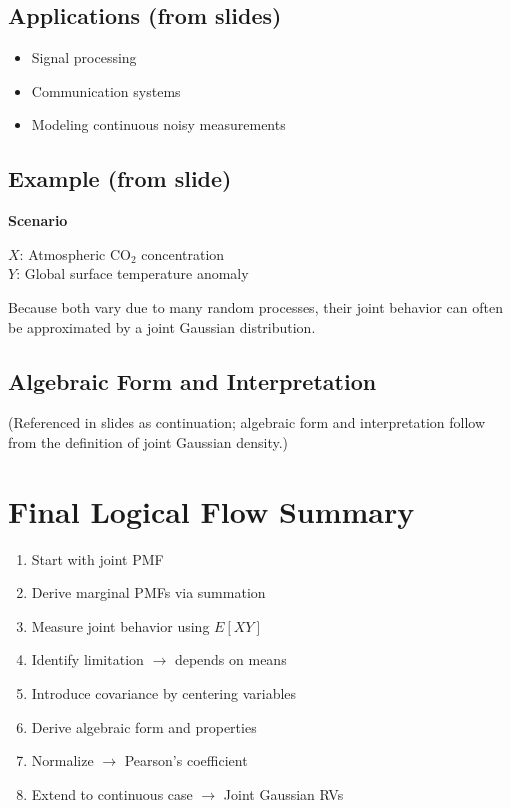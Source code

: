 \documentclass[12pt]{article}
\begin{document}
\subsection{Applications (from slides)}

\begin{itemize}
\item Signal processing
\item Communication systems
\item Modeling continuous noisy measurements
\end{itemize}

\subsection{Example (from slide)}

\textbf{Scenario}

$X$: Atmospheric CO$_2$ concentration \\
$Y$: Global surface temperature anomaly

Because both vary due to many random processes, their joint behavior can often be approximated by a joint Gaussian distribution.

\subsection{Algebraic Form and Interpretation}

(Referenced in slides as continuation; algebraic form and interpretation follow from the definition of joint Gaussian density.)

\section{Final Logical Flow Summary}

\begin{enumerate}
\item Start with joint PMF
\item Derive marginal PMFs via summation
\item Measure joint behavior using $E[XY]$
\item Identify limitation $\rightarrow$ depends on means
\item Introduce covariance by centering variables
\item Derive algebraic form and properties
\item Normalize $\rightarrow$ Pearson’s coefficient
\item Extend to continuous case $\rightarrow$ Joint Gaussian RVs
\end{enumerate}
\end{document}
